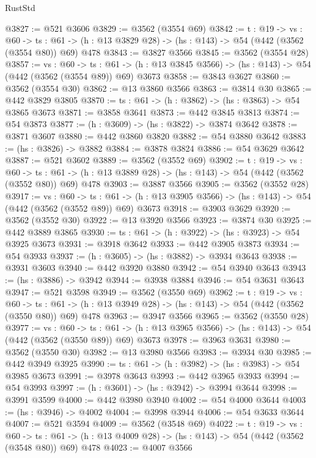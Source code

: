 \begin{lexlean}{RustStd}
\begin{coremodule}
@3827 := @521 @3606
@3829 := @3562 (@3554 @69)
@3842 := {t : @19} ->
  {vs : @60} ->
  {ts : @61} -> (h : @13 @3829 @28) -> (hs : @143) -> @54 (@442 (@3562 (@3554 @80)) @69) @478
@3843 := @3827 @3566
@3845 := @3562 (@3554 @28)
@3857 := {vs : @60} ->
  {ts : @61} -> (h : @13 @3845 @3566) -> (hs : @143) -> @54 (@442 (@3562 (@3554 @89)) @69) @3673
@3858 := @3843 @3627
@3860 := @3562 (@3554 @30)
@3862 := @13 @3860 @3566
@3863 := @3814 @30
@3865 := @442 @3829 @3805
@3870 := {ts : @61} -> (h : @3862) -> (hs : @3863) -> @54 @3865 @3673
@3871 := @3858 @3641
@3873 := @442 @3845 @3813
@3874 := @54 @3873
@3877 := (h : @3609) -> (hs : @3822) -> @3874 @3642
@3878 := @3871 @3607
@3880 := @442 @3860 @3820
@3882 := @54 @3880 @3642
@3883 := (hs : @3826) -> @3882
@3884 := @3878 @3824
@3886 := @54 @3629 @3642
@3887 := @521 @3602
@3889 := @3562 (@3552 @69)
@3902 := {t : @19} ->
  {vs : @60} ->
  {ts : @61} -> (h : @13 @3889 @28) -> (hs : @143) -> @54 (@442 (@3562 (@3552 @80)) @69) @478
@3903 := @3887 @3566
@3905 := @3562 (@3552 @28)
@3917 := {vs : @60} ->
  {ts : @61} -> (h : @13 @3905 @3566) -> (hs : @143) -> @54 (@442 (@3562 (@3552 @89)) @69) @3673
@3918 := @3903 @3629
@3920 := @3562 (@3552 @30)
@3922 := @13 @3920 @3566
@3923 := @3874 @30
@3925 := @442 @3889 @3865
@3930 := {ts : @61} -> (h : @3922) -> (hs : @3923) -> @54 @3925 @3673
@3931 := @3918 @3642
@3933 := @442 @3905 @3873
@3934 := @54 @3933
@3937 := (h : @3605) -> (hs : @3882) -> @3934 @3643
@3938 := @3931 @3603
@3940 := @442 @3920 @3880
@3942 := @54 @3940 @3643
@3943 := (hs : @3886) -> @3942
@3944 := @3938 @3884
@3946 := @54 @3631 @3643
@3947 := @521 @3598
@3949 := @3562 (@3550 @69)
@3962 := {t : @19} ->
  {vs : @60} ->
  {ts : @61} -> (h : @13 @3949 @28) -> (hs : @143) -> @54 (@442 (@3562 (@3550 @80)) @69) @478
@3963 := @3947 @3566
@3965 := @3562 (@3550 @28)
@3977 := {vs : @60} ->
  {ts : @61} -> (h : @13 @3965 @3566) -> (hs : @143) -> @54 (@442 (@3562 (@3550 @89)) @69) @3673
@3978 := @3963 @3631
@3980 := @3562 (@3550 @30)
@3982 := @13 @3980 @3566
@3983 := @3934 @30
@3985 := @442 @3949 @3925
@3990 := {ts : @61} -> (h : @3982) -> (hs : @3983) -> @54 @3985 @3673
@3991 := @3978 @3643
@3993 := @442 @3965 @3933
@3994 := @54 @3993
@3997 := (h : @3601) -> (hs : @3942) -> @3994 @3644
@3998 := @3991 @3599
@4000 := @442 @3980 @3940
@4002 := @54 @4000 @3644
@4003 := (hs : @3946) -> @4002
@4004 := @3998 @3944
@4006 := @54 @3633 @3644
@4007 := @521 @3594
@4009 := @3562 (@3548 @69)
@4022 := {t : @19} ->
  {vs : @60} ->
  {ts : @61} -> (h : @13 @4009 @28) -> (hs : @143) -> @54 (@442 (@3562 (@3548 @80)) @69) @478
@4023 := @4007 @3566

\end{coremodule}
\end{lexlean}
